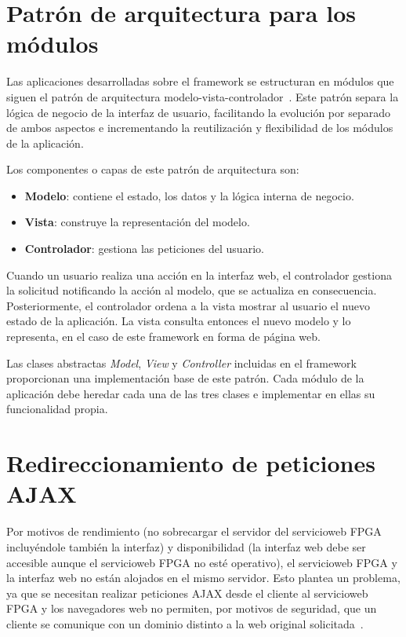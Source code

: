 \section{Patrón de arquitectura para los módulos\label{extra:mvc:mvc}}

Las aplicaciones desarrolladas sobre el \gls{framework} se estructuran en módulos que siguen el patrón de arquitectura modelo-vista-controlador~\cite{mvcpattern}.
Este patrón separa la lógica de negocio de la interfaz de usuario, facilitando la evolución por separado de ambos aspectos e incrementando la reutilización y flexibilidad de los módulos de la aplicación.

Los componentes o capas de este patrón de arquitectura son:
\begin{itemize}
  \item \textbf{Modelo}: contiene el estado, los datos y la lógica interna de negocio.
  \item \textbf{Vista}: construye la representación del modelo.
  \item \textbf{Controlador}: gestiona las peticiones del usuario.
\end{itemize}

Cuando un usuario realiza una acción en la interfaz web, el controlador gestiona la solicitud notificando la acción al modelo, que se actualiza en consecuencia.
Posteriormente, el controlador ordena a la vista mostrar al usuario el nuevo estado de la aplicación.
La vista consulta entonces el nuevo modelo y lo representa, en el caso de este \gls{framework} en forma de página web.

Las clases abstractas \textit{Model}, \textit{View} y \textit{Controller} incluidas en el \gls{framework} proporcionan una implementación base de este patrón.
Cada módulo de la aplicación debe heredar cada una de las tres clases e implementar en ellas su funcionalidad propia.


\section{Redireccionamiento de peticiones AJAX\label{extra:mvc:proxy}}

Por motivos de rendimiento (no sobrecargar el servidor del \gls{servicioweb} \gls{FPGA} incluyéndole también la interfaz) y disponibilidad (la interfaz web debe ser accesible aunque el \gls{servicioweb} \gls{FPGA} no esté operativo), el \gls{servicioweb} \gls{FPGA} y la interfaz web no están alojados en el mismo servidor.
Esto plantea un problema, ya que se necesitan realizar peticiones \gls{AJAX} desde el cliente al \gls{servicioweb} \gls{FPGA} y los navegadores web no permiten, por motivos de seguridad, que un cliente se comunique con un dominio distinto a la web original solicitada~\cite{sameorigin}.

